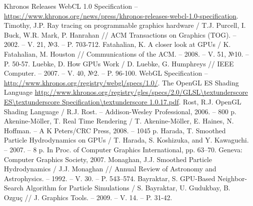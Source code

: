 \documentclass[a4paper,14pt,russian,nocolumnsxix,nocolumnxxxii,nocolumnxxxi,hpadding=10mm]{eskdtext}
\begin{document}
  \maketitle
  
  \newpage
  \tableofcontents 
  
  
  
   
  \newpage

  \begin{thebibliography}{widest entry}
     Khronos Releases WebCL 1.0 Specification -- \url{https://www.khronos.org/news/press/khronos-releases-webcl-1.0-specification}.
     Timothy, J.P. Ray tracing on programmable graphics hardware / T.J. Purcell, I. Buck, W.R. Mark, P. Hanrahan // ACM Transactions on Graphics (TOG). -- 2002. -- V. 21, №3. -- P. 703-712.
     Fatahalian, K. A closer look at GPUs / K. Fatahalian, M. Houston // Communications of the ACM. -- 2008. -- V. 51, №10. -- P. 50-57.
     Luebke, D. How GPUs Work / D. Luebke, G. Humphreys // IEEE Computer. -- 2007. -- V. 40, №2. -- P. 96-100.
     WebGL Specification -- \url{http://www.khronos.org/registry/webgl/specs/1.0/}.
     The OpenGL ES Shading Language \url{http://www.khronos.org/registry/gles/specs/2.0/GLSL\textunderscore ES\textunderscore Specification\textunderscore 1.0.17.pdf}.
     Rost, R.J. OpenGL Shading Language / R.J. Rost. -- Addison-Wesley Professional, 2006. -- 800 p.
     Akenine-Möller, T. Real Time Rendering / T. Akenine-Möller, E. Haines, N. Hoffman. -- A K Peters/CRC Press, 2008. -- 1045 p.
     Harada, T. Smoothed Particle Hydrodynamics on GPUs / T. Harada, S. Koshizuka, and Y. Kawaguchi. -- 2007. -- 8 p.
      In Proc. of Computer Graphics International, pp. 63–70. Geneva: Computer Graphics Society, 2007.
     Monaghan, J.J. Smoothed Particle Hydrodynamics / J.J. Monaghan // Annual Review of Astronomy and Astrophysics. -- 1992. -- V. 30. -- P. 543–574.
     Bayraktar, S. GPU-Based Neighbor-Search Algorithm for Particle Simulations / S. Bayraktar, U. Gudukbay, B. Ozguç // J. Graphics Tools. -- 2009. -- V. 14. -- P. 31-42.
  \end{thebibliography}
\end{document}
